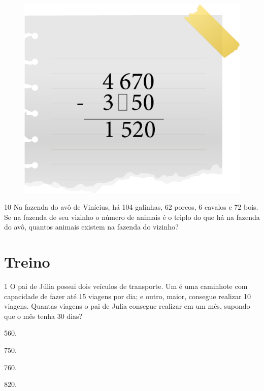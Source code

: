 \begin{figure}[htpb!]
\centering
\includegraphics[width=.7\textwidth]{media/image16.png}
\end{figure}


\num{10} Na fazenda do avô de Vinícius, há 104 galinhas, 62 porcos, 6 cavalos e 72
bois. Se na fazenda de seu vizinho o número de animais é o triplo do que
há na fazenda do avô, quantos animais existem na fazenda do
vizinho?


\section*{Treino}


\num{1} O pai de Júlia possui dois veículos de transporte. 
Um é uma caminhote com capacidade de fazer até 15 viagens por dia; 
e outro, maior, consegue realizar 10 viagens. Quantas viagens o pai de 
Julia consegue realizar em um mês, supondo que o mês tenha 
30 dias?

\begin{multicols}{2}
\begin{escolha}
\item 560.

\item 750.

\item 760.

\item 820.
\end{escolha}
\end{multicols}


